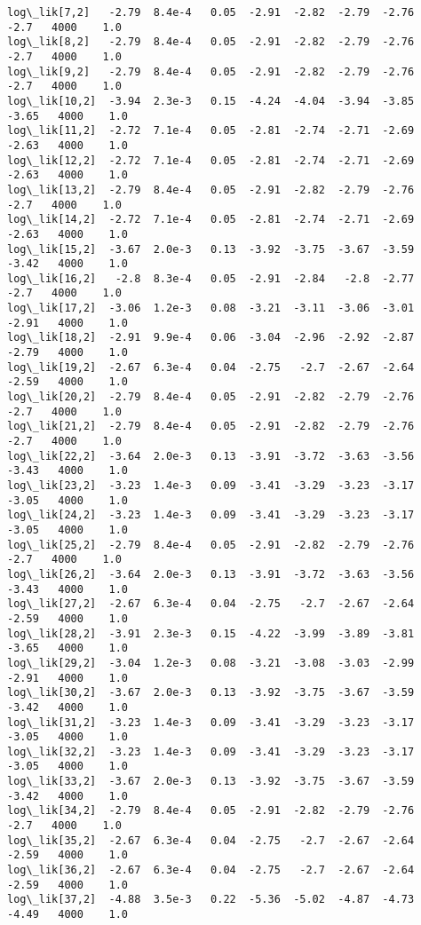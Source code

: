 \documentclass[11pt]{article}
\begin{document}
\begin{Verbatim}[commandchars=\\\{\}]
log\_lik[7,2]   -2.79  8.4e-4   0.05  -2.91  -2.82  -2.79  -2.76   -2.7   4000    1.0
log\_lik[8,2]   -2.79  8.4e-4   0.05  -2.91  -2.82  -2.79  -2.76   -2.7   4000    1.0
log\_lik[9,2]   -2.79  8.4e-4   0.05  -2.91  -2.82  -2.79  -2.76   -2.7   4000    1.0
log\_lik[10,2]  -3.94  2.3e-3   0.15  -4.24  -4.04  -3.94  -3.85  -3.65   4000    1.0
log\_lik[11,2]  -2.72  7.1e-4   0.05  -2.81  -2.74  -2.71  -2.69  -2.63   4000    1.0
log\_lik[12,2]  -2.72  7.1e-4   0.05  -2.81  -2.74  -2.71  -2.69  -2.63   4000    1.0
log\_lik[13,2]  -2.79  8.4e-4   0.05  -2.91  -2.82  -2.79  -2.76   -2.7   4000    1.0
log\_lik[14,2]  -2.72  7.1e-4   0.05  -2.81  -2.74  -2.71  -2.69  -2.63   4000    1.0
log\_lik[15,2]  -3.67  2.0e-3   0.13  -3.92  -3.75  -3.67  -3.59  -3.42   4000    1.0
log\_lik[16,2]   -2.8  8.3e-4   0.05  -2.91  -2.84   -2.8  -2.77   -2.7   4000    1.0
log\_lik[17,2]  -3.06  1.2e-3   0.08  -3.21  -3.11  -3.06  -3.01  -2.91   4000    1.0
log\_lik[18,2]  -2.91  9.9e-4   0.06  -3.04  -2.96  -2.92  -2.87  -2.79   4000    1.0
log\_lik[19,2]  -2.67  6.3e-4   0.04  -2.75   -2.7  -2.67  -2.64  -2.59   4000    1.0
log\_lik[20,2]  -2.79  8.4e-4   0.05  -2.91  -2.82  -2.79  -2.76   -2.7   4000    1.0
log\_lik[21,2]  -2.79  8.4e-4   0.05  -2.91  -2.82  -2.79  -2.76   -2.7   4000    1.0
log\_lik[22,2]  -3.64  2.0e-3   0.13  -3.91  -3.72  -3.63  -3.56  -3.43   4000    1.0
log\_lik[23,2]  -3.23  1.4e-3   0.09  -3.41  -3.29  -3.23  -3.17  -3.05   4000    1.0
log\_lik[24,2]  -3.23  1.4e-3   0.09  -3.41  -3.29  -3.23  -3.17  -3.05   4000    1.0
log\_lik[25,2]  -2.79  8.4e-4   0.05  -2.91  -2.82  -2.79  -2.76   -2.7   4000    1.0
log\_lik[26,2]  -3.64  2.0e-3   0.13  -3.91  -3.72  -3.63  -3.56  -3.43   4000    1.0
log\_lik[27,2]  -2.67  6.3e-4   0.04  -2.75   -2.7  -2.67  -2.64  -2.59   4000    1.0
log\_lik[28,2]  -3.91  2.3e-3   0.15  -4.22  -3.99  -3.89  -3.81  -3.65   4000    1.0
log\_lik[29,2]  -3.04  1.2e-3   0.08  -3.21  -3.08  -3.03  -2.99  -2.91   4000    1.0
log\_lik[30,2]  -3.67  2.0e-3   0.13  -3.92  -3.75  -3.67  -3.59  -3.42   4000    1.0
log\_lik[31,2]  -3.23  1.4e-3   0.09  -3.41  -3.29  -3.23  -3.17  -3.05   4000    1.0
log\_lik[32,2]  -3.23  1.4e-3   0.09  -3.41  -3.29  -3.23  -3.17  -3.05   4000    1.0
log\_lik[33,2]  -3.67  2.0e-3   0.13  -3.92  -3.75  -3.67  -3.59  -3.42   4000    1.0
log\_lik[34,2]  -2.79  8.4e-4   0.05  -2.91  -2.82  -2.79  -2.76   -2.7   4000    1.0
log\_lik[35,2]  -2.67  6.3e-4   0.04  -2.75   -2.7  -2.67  -2.64  -2.59   4000    1.0
log\_lik[36,2]  -2.67  6.3e-4   0.04  -2.75   -2.7  -2.67  -2.64  -2.59   4000    1.0
log\_lik[37,2]  -4.88  3.5e-3   0.22  -5.36  -5.02  -4.87  -4.73  -4.49   4000    1.0

\end{Verbatim}
\end{document}
